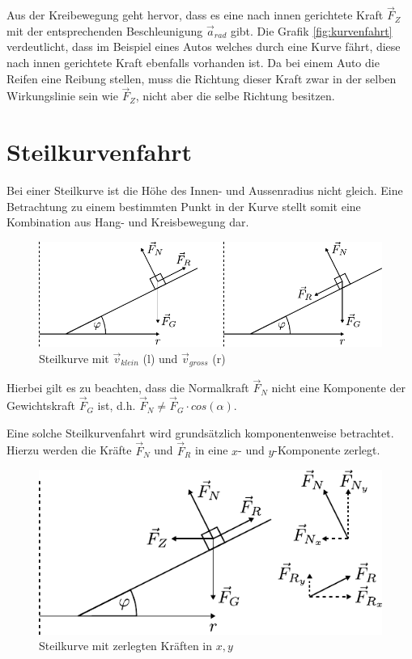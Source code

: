 \noindent
Aus der Kreibewegung geht hervor, dass es eine nach innen gerichtete
Kraft $\vec{F}_Z$ mit der entsprechenden Beschleunigung $\vec{a}_{rad}$
gibt. Die Grafik \ref{fig:kurvenfahrt} verdeutlicht, dass im Beispiel 
eines Autos welches durch eine Kurve fährt, diese nach innen gerichtete 
Kraft ebenfalls vorhanden ist. Da bei einem Auto die Reifen eine Reibung 
stellen, muss die Richtung dieser Kraft zwar in der selben Wirkungslinie
sein wie $\vec{F}_Z$, nicht aber die selbe Richtung besitzen.  

\newpage
\section{Steilkurvenfahrt}
Bei einer Steilkurve ist die Höhe des Innen- und Aussenradius nicht
gleich. Eine Betrachtung zu einem bestimmten Punkt in der Kurve stellt
somit eine Kombination aus Hang- und Kreisbewegung dar. 

\begin{figure}[h!]
	\centering
	\includegraphics[scale=0.8]{kurve1.pdf}
	\caption{Steilkurve mit 
		$\vec{v}_{klein}$ (l) und $\vec{v}_{gross}$ (r)}
	\label{fig:steilkurve1}
\end{figure}

\noindent
Hierbei gilt es zu beachten, dass die Normalkraft $\vec{F}_N$ nicht 
eine Komponente der Gewichtskraft $\vec{F}_G$ ist, d.h. 
$\vec{F}_N \neq \vec{F}_G \cdot cos(\alpha)$. 

Eine solche Steilkurvenfahrt wird grundsätzlich komponentenweise
betrachtet. Hierzu werden die Kräfte $\vec{F}_N$ und $\vec{F}_R$ in
eine $x$- und $y$-Komponente zerlegt.

\begin{figure}[h!]
	\centering
	\includegraphics[scale=0.8]{kurve2.pdf}
	\caption{Steilkurve mit zerlegten Kräften in $x,y$}
	\label{fig:steilkurve2}
\end{figure}

